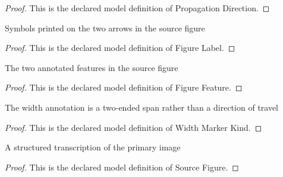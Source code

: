 \begin{proof}
  This is the declared model definition of Propagation Direction.
\end{proof}
\begin{definition}
  \label{def:physics:phyx-mini-0285:phyxminiproblems-problemphyxmini0285-figurelabel}
  Symbols printed on the two arrows in the source figure
\end{definition}
\begin{proof}
  This is the declared model definition of Figure Label.
\end{proof}
\begin{definition}
  \label{def:physics:phyx-mini-0285:phyxminiproblems-problemphyxmini0285-figurefeature}
  The two annotated features in the source figure
\end{definition}
\begin{proof}
  This is the declared model definition of Figure Feature.
\end{proof}
\begin{definition}
  \label{def:physics:phyx-mini-0285:phyxminiproblems-problemphyxmini0285-widthmarkerkind}
  The width annotation is a two-ended span rather than a direction of travel
\end{definition}
\begin{proof}
  This is the declared model definition of Width Marker Kind.
\end{proof}
\begin{definition}
  \label{def:physics:phyx-mini-0285:phyxminiproblems-problemphyxmini0285-sourcefigure}
  A structured transcription of the primary image
\end{definition}
\begin{proof}
  This is the declared model definition of Source Figure.
\end{proof}
